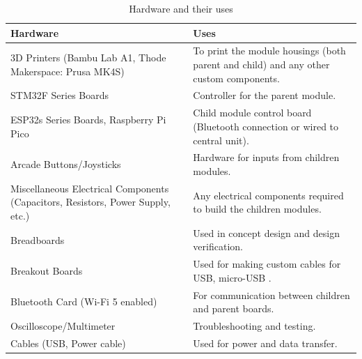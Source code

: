 \documentclass[a4]{article}
\begin{document}
\begin{table}[h!]
	\renewcommand{\arraystretch}{1.2} %
	\centering
	\begin{tabularx}{\linewidth}{|Y|Y|}
		\hline
		\textcolor{McMasterMaroon}{\textbf{Hardware}}                                   & \textcolor{McMasterMaroon}{\textbf{Uses}}                                    \\
		\hline
		3D Printers (Bambu Lab A1, Thode Makerspace: Prusa MK4S)                        & To print the module housings (both parent and child) and any other custom components.    \\
		\hline
		STM32F Series Boards                                                            & Controller for the parent module.                                        \\
		\hline
		ESP32s Series Boards, Raspberry Pi Pico                                         & Child module control board (Bluetooth connection or wired to central unit).  \\
		\hline
		Arcade Buttons/Joysticks                                                        & Hardware for inputs from children modules.                                   \\
		\hline
		Miscellaneous Electrical Components (Capacitors, Resistors, Power Supply, etc.) & Any electrical components required to build the children modules. \\
		\hline
		Breadboards                                                                     & Used in concept design and design verification.                              \\
		\hline
		Breakout Boards                                                                 & Used for making custom cables for USB, micro-USB .                           \\
		\hline
		Bluetooth Card (Wi-Fi 5 enabled)                                                & For communication between children and parent boards.                        \\
		\hline
		Oscilloscope/Multimeter                                                         & Troubleshooting and testing.                                                 \\
		\hline
		Cables (USB, Power cable)                                                       & Used for power and data transfer.                                            \\
		\hline
	\end{tabularx}
	\caption{Hardware and their uses}
\end{table}
\end{document}
